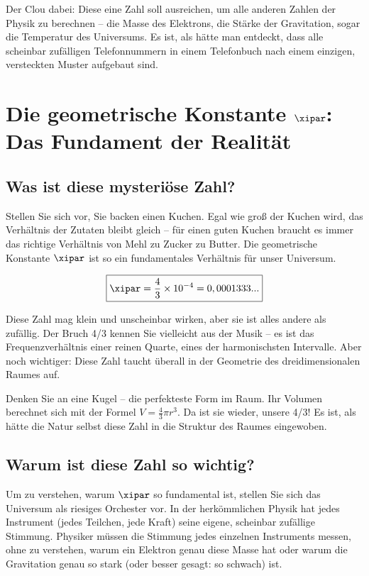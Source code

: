 	Der Clou dabei: Diese eine Zahl soll ausreichen, um alle anderen Zahlen der Physik zu berechnen -- die Masse des Elektrons, die Stärke der Gravitation, sogar die Temperatur des Universums. Es ist, als hätte man entdeckt, dass alle scheinbar zufälligen Telefonnummern in einem Telefonbuch nach einem einzigen, versteckten Muster aufgebaut sind.
	
	\section{Die geometrische Konstante $\xipar$: Das Fundament der Realität}
	
	\subsection{Was ist diese mysteriöse Zahl?}
	
	Stellen Sie sich vor, Sie backen einen Kuchen. Egal wie groß der Kuchen wird, das Verhältnis der Zutaten bleibt gleich -- für einen guten Kuchen braucht es immer das richtige Verhältnis von Mehl zu Zucker zu Butter. Die geometrische Konstante $\xipar$ ist so ein fundamentales Verhältnis für unser Universum.
	
	\begin{equation}
		\boxed{\xipar = \frac{4}{3} \times 10^{-4} = 0,0001333...}
	\end{equation}
	
	Diese Zahl mag klein und unscheinbar wirken, aber sie ist alles andere als zufällig. Der Bruch 4/3 kennen Sie vielleicht aus der Musik -- es ist das Frequenzverhältnis einer reinen Quarte, eines der harmonischsten Intervalle. Aber noch wichtiger: Diese Zahl taucht überall in der Geometrie des dreidimensionalen Raumes auf.
	
	Denken Sie an eine Kugel -- die perfekteste Form im Raum. Ihr Volumen berechnet sich mit der Formel $V = \frac{4}{3}\pi r^3$. Da ist sie wieder, unsere 4/3! Es ist, als hätte die Natur selbst diese Zahl in die Struktur des Raumes eingewoben.
	
	\subsection{Warum ist diese Zahl so wichtig?}
	
	Um zu verstehen, warum $\xipar$ so fundamental ist, stellen Sie sich das Universum als riesiges Orchester vor. In der herkömmlichen Physik hat jedes Instrument (jedes Teilchen, jede Kraft) seine eigene, scheinbar zufällige Stimmung. Physiker müssen die Stimmung jedes einzelnen Instruments messen, ohne zu verstehen, warum ein Elektron genau diese Masse hat oder warum die Gravitation genau so stark (oder besser gesagt: so schwach) ist.
	

